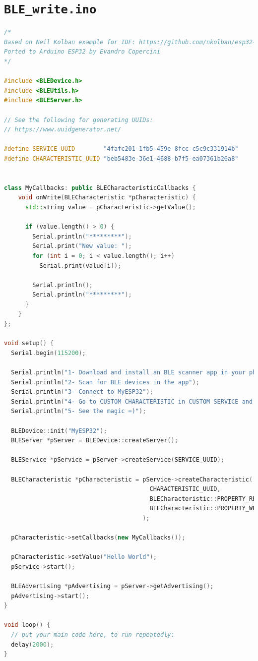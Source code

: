 \documentclass[12pt,openany,a4paper]{book}
\begin{document}
\section{\texttt{BLE\_write.ino}}
\label{code:ble_write}
\begin{lstlisting}[basicstyle=\ttfamily,breaklines=true,language=c++]
/*
Based on Neil Kolban example for IDF: https://github.com/nkolban/esp32-snippets/blob/master/cpp_utils/tests/BLE%20Tests/SampleWrite.cpp
Ported to Arduino ESP32 by Evandro Copercini
*/

#include <BLEDevice.h>
#include <BLEUtils.h>
#include <BLEServer.h>

// See the following for generating UUIDs:
// https://www.uuidgenerator.net/

#define SERVICE_UUID        "4fafc201-1fb5-459e-8fcc-c5c9c331914b"
#define CHARACTERISTIC_UUID "beb5483e-36e1-4688-b7f5-ea07361b26a8"


class MyCallbacks: public BLECharacteristicCallbacks {
    void onWrite(BLECharacteristic *pCharacteristic) {
      std::string value = pCharacteristic->getValue();

      if (value.length() > 0) {
        Serial.println("*********");
        Serial.print("New value: ");
        for (int i = 0; i < value.length(); i++)
          Serial.print(value[i]);

        Serial.println();
        Serial.println("*********");
      }
    }
};

void setup() {
  Serial.begin(115200);

  Serial.println("1- Download and install an BLE scanner app in your phone");
  Serial.println("2- Scan for BLE devices in the app");
  Serial.println("3- Connect to MyESP32");
  Serial.println("4- Go to CUSTOM CHARACTERISTIC in CUSTOM SERVICE and write something");
  Serial.println("5- See the magic =)");

  BLEDevice::init("MyESP32");
  BLEServer *pServer = BLEDevice::createServer();

  BLEService *pService = pServer->createService(SERVICE_UUID);

  BLECharacteristic *pCharacteristic = pService->createCharacteristic(
                                         CHARACTERISTIC_UUID,
                                         BLECharacteristic::PROPERTY_READ |
                                         BLECharacteristic::PROPERTY_WRITE
                                       );

  pCharacteristic->setCallbacks(new MyCallbacks());

  pCharacteristic->setValue("Hello World");
  pService->start();

  BLEAdvertising *pAdvertising = pServer->getAdvertising();
  pAdvertising->start();
}

void loop() {
  // put your main code here, to run repeatedly:
  delay(2000);
}
\end{lstlisting}
\end{document}
